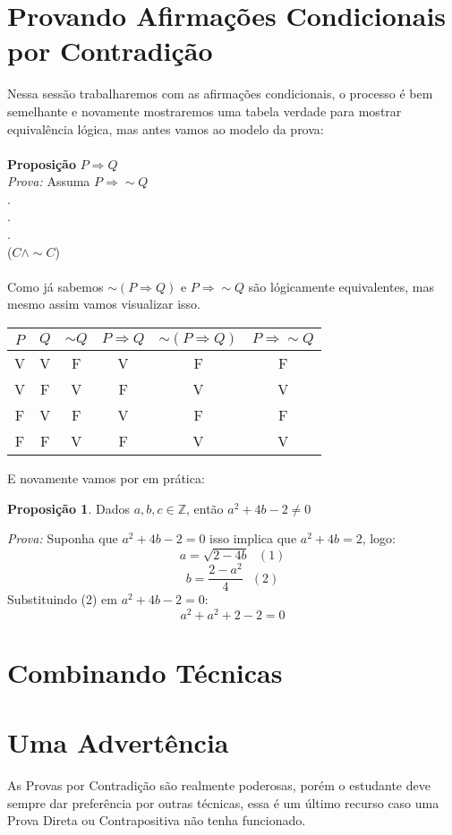 \documentclass[a4paper,11pt,oneside]{book}
\theoremstyle{definition}
\theoremstyle{break}
\newtheorem{proposition}{Proposição}
\begin{document}
\section{Provando Afirmações Condicionais por Contradição}
Nessa sessão trabalharemos com as afirmações condicionais, o processo é bem semelhante e novamente mostraremos uma tabela verdade para mostrar equivalência lógica, mas antes vamos ao modelo da prova: \\ \\
\textbf{Proposição} $P \Rightarrow Q$ \\
\textit{Prova:} Assuma $P \Rightarrow \sim Q$\\
. \\
. \\
. \\
($C \land \sim C$) \\ \\
Como já sabemos $\sim(P \Rightarrow Q)$ e $P \Rightarrow \sim Q$ são lógicamente equivalentes, mas mesmo assim vamos visualizar isso. \\
\begin{center}
\begin{tabular}{| c | c || c | c | c | c |} \hline
$P$ & $Q$ & $\sim Q$ & $P \Rightarrow Q$ & $\sim(P \Rightarrow Q)$ & $P \Rightarrow \sim Q$ \\ \hline
V & V & F & V & F & F \\ 
V & F & V & F & V & V \\ 
F & V & F & V & F & F \\ 
F & F & V & F & V & V \\ \hline
\end{tabular}
\end{center}
E novamente vamos por em prática:
\begin{proposition}
Dados $a,b,c \in \mathbb{Z}$, então $a^2 + 4b -2 \neq 0$
\end{proposition}
\textit{Prova:} Suponha que $a^2 + 4b -2 = 0$ isso implica que $a^2 + 4b = 2$, logo:
$$a = \sqrt{2-4b} \ \ \ (1)$$
$$b = \frac{2-a^2}{4} \ \ \ (2) $$
Substituindo (2) em $a^2 + 4b -2 = 0$:
$$a^2 + a^2 + 2 -2 = 0$$
\section{Combinando Técnicas}
\section{Uma Advertência}
As Provas por Contradição são realmente poderosas, porém o estudante deve sempre dar preferência por outras técnicas, essa é um último recurso caso uma Prova Direta ou Contrapositiva não tenha funcionado.
\end{document}

